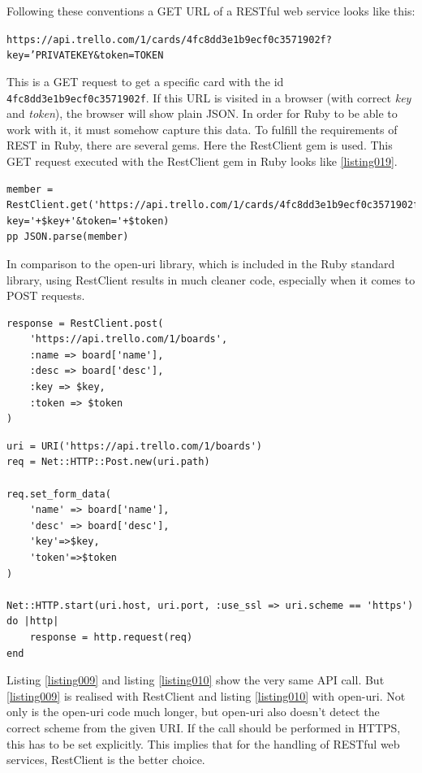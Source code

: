 Following these conventions a GET URL of a RESTful web service looks like this:
\begin{center}
\texttt{https://api.trello.com/1/cards/4fc8dd3e1b9ecf0c3571902f? key='PRIVATEKEY\&token=TOKEN}
\end{center}
This is a GET request to get a specific card with the id \texttt{4fc8dd3e1b9ecf0c3571902f}. If this URL is visited in a browser (with correct \emph{key} and \emph{token}), the browser will show plain JSON. In order for Ruby to be able to work with it, it must somehow capture this data. To fulfill the requirements of REST in Ruby, there are several gems. Here the RestClient gem is used. This GET request executed with the RestClient gem in Ruby looks like \ref{listing019}.

\begin{lstlisting}[aboveskip=1\baselineskip, caption=GET request using RestClient., label=listing019]
member = RestClient.get('https://api.trello.com/1/cards/4fc8dd3e1b9ecf0c3571902f?key='+$key+'&token='+$token)
pp JSON.parse(member)
\end{lstlisting}

In comparison to the open-uri library, which is included in the Ruby standard library, using RestClient results in much cleaner code, especially when it comes to POST requests.

\begin{lstlisting}[aboveskip=1\baselineskip, caption=POST request using RestClient., label=listing009]
response = RestClient.post(
	'https://api.trello.com/1/boards',
	:name => board['name'], 
	:desc => board['desc'],
	:key => $key,
	:token => $token
)
\end{lstlisting}

\begin{lstlisting}[aboveskip=1\baselineskip, caption=POST request with open-uri., label=listing010]
uri = URI('https://api.trello.com/1/boards')
req = Net::HTTP::Post.new(uri.path)

req.set_form_data(
	'name' => board['name'], 
	'desc' => board['desc'],
	'key'=>$key,
	'token'=>$token
)

Net::HTTP.start(uri.host, uri.port, :use_ssl => uri.scheme == 'https') do |http|
	response = http.request(req)
end
\end{lstlisting}

Listing \ref{listing009} and listing \ref{listing010} show the very same API call. But \ref{listing009} is realised with RestClient and listing \ref{listing010} with open-uri. Not only is the open-uri code much longer, but open-uri also doesn't detect the correct scheme from the given URI. If the call should be performed in HTTPS, this has to be set explicitly. This implies that for the handling of RESTful web services, RestClient is the better choice.


